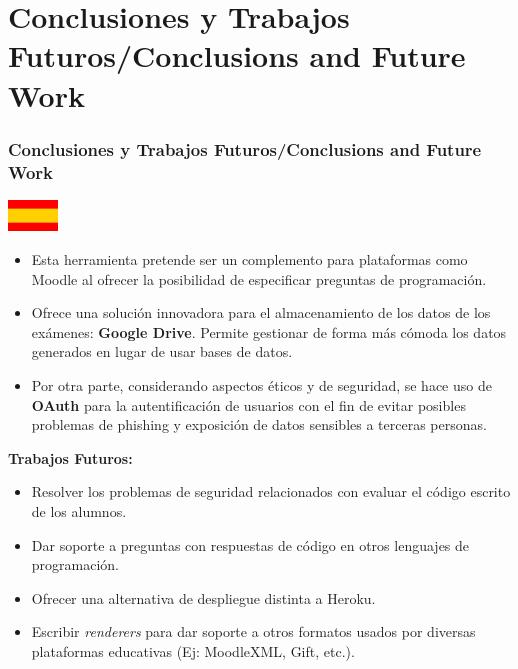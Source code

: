 \documentclass{beamer}
\begin{document}
\section{Conclusiones y Trabajos Futuros/Conclusions and Future Work}
\begin{frame}[allowframebreaks]
  \frametitle{Conclusiones y Trabajos Futuros/Conclusions and Future Work}
  
  \begin{center}
    \includegraphics[width=0.1\textwidth]{img/espanol.eps}
  \end{center}
  
  \begin{itemize}
    \item Esta herramienta pretende ser un complemento para plataformas como Moodle al ofrecer la posibilidad de
    especificar preguntas de programación.
    \item Ofrece una solución innovadora para el almacenamiento de los datos de los exámenes: {\bfseries Google Drive}.
    Permite gestionar de forma más cómoda los datos generados en lugar de usar bases de datos.
    \item Por otra parte, considerando aspectos éticos y de seguridad, se hace uso de {\bfseries OAuth} para la autentificación de usuarios con el fin de evitar
    posibles problemas de phishing y exposición de datos sensibles a terceras personas.
  \end{itemize}
  \framebreak
  
  {\bf Trabajos Futuros:}
  \begin{itemize}
    \item Resolver los problemas de seguridad relacionados con evaluar el código escrito de los alumnos.
    \item Dar soporte a preguntas con respuestas de código en otros lenguajes de programación.
    \item Ofrecer una alternativa de despliegue distinta a Heroku.
    \item Escribir \textit{renderers} para dar soporte a otros formatos usados por diversas plataformas educativas (Ej: MoodleXML, Gift, etc.).
  \end{itemize}
  \framebreak
  

\end{frame}
\end{document}
